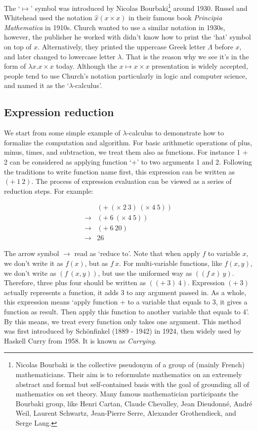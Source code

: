 \documentclass{article}
\begin{document}
The `$\mapsto$' symbol was introduced by Nicolas Bourbaki\footnote{Nicolas Bourbaki is the collective pseudonym of a group of (mainly French) mathematicians. Their aim is to reformulate mathematics on an extremely abstract and formal but self-contained basis with the goal of grounding all of mathematics on set theory. Many famous mathematician participants the Bourbaki group, like Henri Cartan, Claude Chevalley, Jean Dieudonné, André Weil, Laurent Schwartz, Jean-Pierre Serre, Alexander Grothendieck, and Serge Lang.} around 1930. Russel and Whitehead used the notation $\hat{x}(x \times x)$ in their famous book {\em Principia Mathematica} in 1910s. Church wanted to use a similar notation in 1930s, however, the publisher he worked with didn't know how to print the `hat' symbol on top of $x$. Alternatively, they printed the uppercase Greek letter $\Lambda$ before $x$, and later changed to lowercase letter $\lambda$. That is the reason why we see it's in the form of $\lambda x . x \times x$ today\cite{Dowek2011}. Although the $x \mapsto x \times x$ presentation is widely accepted, people tend to use Church's notation particularly in logic and computer science, and named it as the `$\lambda$-calculus'.

\subsection{Expression reduction}

We start from some simple example of $\lambda$-calculus to demonstrate how to formalize the computation and algorithm. For basic arithmetic operations of plus, minus, times, and subtraction, we treat them also as functions. For instance 1 + 2 can be considered as applying function `+' to two arguments 1 and 2. Following the traditions to write function name first, this expression can be written as $(+\ 1\ 2)$. The process of expression evaluation can be viewed as a series of reduction steps. For example:

\[
\begin{array}{ll}
    & (+\ (\times\ 2\ 3)\ (\times\ 4\ 5)) \\
\to & (+\ 6\ (\times\ 4\ 5)) \\
\to & (+\ 6\ 20) \\
\to & 26
\end{array}
\]

The arrow symbol $\to$ read as `reduce to'. Note that when apply $f$ to variable $x$, we don't write it as $f(x)$, but as $f\ x$. For multi-variable functions, like $f(x, y)$, we don't write as $(f\ (x, y))$, but use the uniformed way as $((f\ x)\ y)$. Therefore, three plus four should be written as $((+\ 3)\ 4)$. Expression $(+\ 3)$ actually represents a function, it adds 3 to any argument passed in. As a whole, this expression means `apply function + to a variable that equals to 3, it gives a function as result. Then apply this function to another variable that equals to 4'. By this means, we treat every function only takes one argument. This method was first introduced by Schönfinkel (1889 - 1942) in 1924, then widely used by Haskell Curry from 1958. It is known as {\em Currying}\cite{SPJ1987}.
\end{document}
